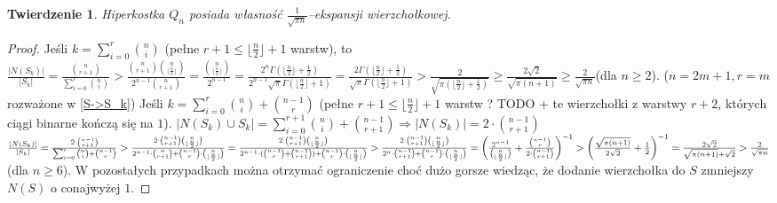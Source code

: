 \documentclass{pracamgr}
\newtheorem{theorem}{Twierdzenie}
\begin{document}
   \begin{theorem}\label{ekspansja kostki}%
    Hiperkostka $Q_n$ posiada własność $\frac{1}{\sqrt{\pi n}}$--ekspansji wierzchołkowej.
   \end{theorem}
   \begin{proof}
    Jeśli $k=\sum_{i=0}^{r}{n\choose i}$ (pełne $r+1\le\lfloor\frac{n}{2}\rfloor+1$ warstw), to%
    $\frac{|N(S_k)|}{|S_k|}=\frac{{n\choose r+1}}{\sum_{i=0}^{r}{n \choose i}}>\frac{{n\choose r+1}{n\choose \lfloor\frac{n}{2}\rfloor}}{2^{n-1}{n\choose r+1}}
    =\frac{{n\choose \lfloor\frac{n}{2}\rfloor}}{2^{n-1}}=\frac{2^n\Gamma(\lfloor\frac{n}{2}\rfloor+\frac{1}{2})}{2^{n-1}\sqrt{\pi}\Gamma(\lfloor\frac{n}{2}\rfloor+1)}=
    \frac{2\Gamma(\lfloor\frac{n}{2}\rfloor+\frac{1}{2})}{\sqrt{\pi}\Gamma(\lfloor\frac{n}{2}\rfloor+1)}>\frac{2}{\sqrt{\pi (\lfloor\frac{n}{2}\rfloor+\frac{1}{2})}}
    \ge\frac{2\sqrt{2}}{\sqrt{\pi (n+1)}}\ge\frac{2}{\sqrt{\pi n}}$(dla $n\ge2$).\newline
    ($n=2m+1,r=m$ rozważone w \ref{S->S_k})\newline
    Jeśli $k=\sum_{i=0}^{r}{n\choose i}+{n-1 \choose r}$
    (pełne $r+1\le\lfloor\frac{n}{2}\rfloor+1$ warstw ? TODO + te wierzchołki z warstwy $r+2$, których ciągi binarne kończą się na $1$).\newline
    $|N(S_k)\cup S_k|=\sum_{i=0}^{r+1}{n\choose i}+{n-1 \choose r+1}\Rightarrow |N(S_k)|=2\cdot{n-1\choose r+1}$\newline
    $\frac{|N(S_k)|}{|S_k|}=\frac{2\cdot{n-1 \choose r+1}}{\sum_{i=0}^{r}{n\choose i}+{n-1 \choose r}}>
    \frac{2\cdot{n-1\choose r+1}{n\choose\lfloor\frac{n}{2}\rfloor}}{2^{n-1}\cdot{n\choose r+1}+{n-1\choose r}\cdot{n\choose\lfloor\frac{n}{2}\rfloor}}=
    \frac{2\cdot{n-1\choose r+1}{n\choose\lfloor\frac{n}{2}\rfloor}}{2^{n-1}\cdot({n-1\choose r}+{n-1\choose r+1})+{n-1\choose r}\cdot{n\choose\lfloor\frac{n}{2}\rfloor}}>\newline
    \frac{2\cdot{n-1\choose r+1}{n\choose\lfloor\frac{n}{2}\rfloor}}{2^{n}\cdot{n-1\choose r+1}+{n-1\choose r}\cdot{n\choose\lfloor\frac{n}{2}\rfloor}}=
    \left(\frac{2^{n-1}}{{n\choose\lfloor\frac{n}{2}\rfloor}}+\frac{{n-1\choose r}}{2\cdot{n-1\choose r+1}}\right)^{-1}>
    \left(\frac{\sqrt{\pi(n+1)}}{2\sqrt{2}}+\frac{1}{2}\right)^{-1}=\frac{2\sqrt{2}}{\sqrt{\pi(n+1)}+\sqrt{2}}>\frac{2}{\sqrt{\pi n}}$(dla $n\ge 6$).\newline
    W pozostałych przypadkach można otrzymać ograniczenie choć dużo gorsze wiedząc, że dodanie wierzchołka do $S$ zmniejszy $N(S)$ o conajwyżej $1$.\newline

\end{proof}
\end{document}

